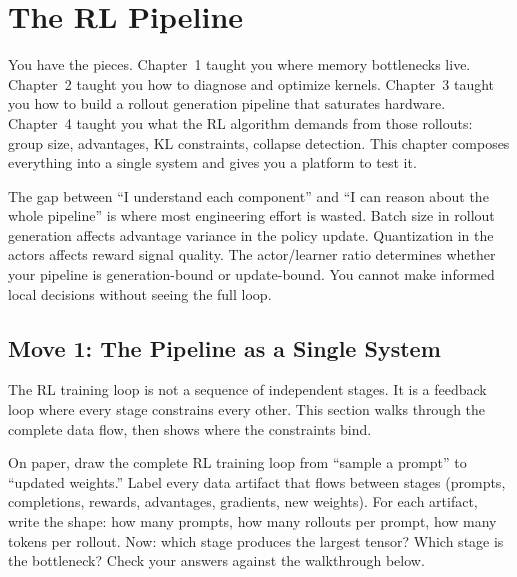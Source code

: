 \section*{The RL Pipeline}

\smallskip

\begin{whythis}
You have the pieces. Chapter~1 taught you where memory bottlenecks live. Chapter~2 taught you how to diagnose and optimize kernels. Chapter~3 taught you how to build a rollout generation pipeline that saturates hardware. Chapter~4 taught you what the RL algorithm demands from those rollouts: group size, advantages, KL constraints, collapse detection. This chapter composes everything into a single system and gives you a platform to test it.

The gap between ``I understand each component'' and ``I can reason about the whole pipeline'' is where most engineering effort is wasted. Batch size in rollout generation affects advantage variance in the policy update. Quantization in the actors affects reward signal quality. The actor/learner ratio determines whether your pipeline is generation-bound or update-bound. You cannot make informed local decisions without seeing the full loop.
\end{whythis}

\subsection*{Move 1: The Pipeline as a Single System}

The RL training loop is not a sequence of independent stages. It is a feedback loop where every stage constrains every other. This section walks through the complete data flow, then shows where the constraints bind.

\begin{thinkfirst}
On paper, draw the complete RL training loop from ``sample a prompt'' to ``updated weights.'' Label every data artifact that flows between stages (prompts, completions, rewards, advantages, gradients, new weights). For each artifact, write the shape: how many prompts, how many rollouts per prompt, how many tokens per rollout. Now: which stage produces the largest tensor? Which stage is the bottleneck? Check your answers against the walkthrough below.
\end{thinkfirst}


